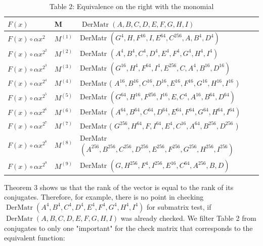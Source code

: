 \documentclass[10pt]{article}
\begin{document}
\begin{table}[h]
\begin{center}
\begin{tabular}{|l|l|l|}
\hline
$F(x)$ & M & $\operatorname{DerMatr}(A, B, C, D, E, F, G, H, I)$ \\
\hline
$F(x) \circ \alpha x^{2}$ & $M^{(1)}$ & DerMatr $\left(G^{4}, H, F^{16}, I, E^{64}, C^{256}, A, B^{4}, D^{4}\right)$ \\
\hline
$F(x) \circ \alpha x^{2^{2}}$ & $M^{(2)}$ & DerMatr $\left(A^{4}, B^{4}, C^{4}, D^{4}, E^{4}, F^{4}, G^{4}, H^{4}, I^{4}\right)$ \\
\hline
$F(x) \circ \alpha x^{2^{3}}$ & $M^{(3)}$ & DerMatr $\left(G^{16}, H^{4}, F^{64}, I^{4}, E^{256}, C, A^{4}, B^{16}, D^{16}\right)$ \\
\hline
$F(x) \circ \alpha x^{2^{4}}$ & $M^{(4)}$ & DerMatr ( $A^{16}, B^{16}, C^{16}, D^{16}, E^{16}, F^{16}, G^{16}, H^{16}, I^{16}$ ) \\
\hline
$F(x) \circ \alpha x^{2^{5}}$ & $M^{(5)}$ & DerMatr $\left(G^{64}, H^{16}, F^{256}, I^{16}, E, C^{4}, A^{16}, B^{64}, D^{64}\right)$ \\
\hline
$F(x) \circ \alpha x^{2^{6}}$ & $M^{(6)}$ & DerMatr $\left(A^{64}, B^{64}, C^{64}, D^{64}, E^{64}, F^{64}, G^{64}, H^{64}, I^{64}\right)$ \\
\hline
$F(x) \circ \alpha x^{2^{7}}$ & $M^{(7)}$ & DerMatr ( $G^{256}, H^{64}, F, I^{64}, E^{4}, C^{16}, A^{64}, B^{256}, D^{256}$ ) \\
\hline
$F(x) \circ \alpha x^{2^{8}}$ & $M^{(8)}$ & DerMatr $\left(A^{256}, B^{256}, C^{256}, D^{256}, E^{256}, F^{256}, G^{256}, H^{256}, I^{256}\right)$ \\
\hline
$F(x) \circ \alpha x^{2^{9}}$ & $M^{(9)}$ & DerMatr $\left(G, H^{256}, F^{4}, I^{256}, E^{16}, C^{64}, A^{256}, B, D\right)$ \\
\hline
\end{tabular}
\captionsetup{labelformat=empty}
\caption{Table 2: Equivalence on the right with the monomial}
\end{center}
\end{table}

Theorem 3 shows us that the rank of the vector is equal to the rank of its conjugates. Therefore, for example, there is no point in checking $\operatorname{DerMatr}\left(A^{4}, B^{4}, C^{4}, D^{4}, E^{4}, F^{4}, G^{4}, H^{4}, I^{4}\right)$ for submatrix test, if $\operatorname{DerMatr}(A, B, C, D, E, F, G, H, I)$ was already checked. We filter Table 2 from conjugates to only one "important" for the check matrix that corresponds to the equivalent function:
\end{document}
